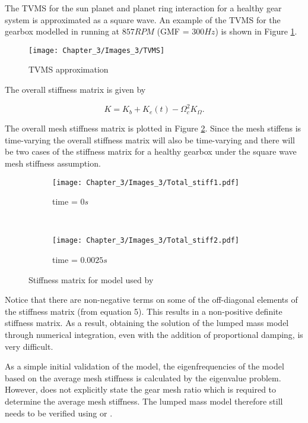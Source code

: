 The TVMS for the sun planet and planet ring interaction for a healthy gear system is approximated as a square wave. An example of the TVMS for the gearbox modelled in \cite{Chaari2006} running at $857RPM$ (GMF = $300Hz$) is shown in Figure \ref{F:TVMS}.


\begin{figure}[H]
	\centering
	\texttt{[image: Chapter\_3/Images\_3/TVMS]}
	\caption{TVMS approximation}
	\label{F:TVMS}
\end{figure}


The overall stiffness matrix is given by

\begin{equation}
K = K_{b}+K_{e}(t)-\Omega_{c}^{2} K_{\Omega}.
\end{equation}

The overall mesh stiffness matrix is plotted in Figure \ref{F:Stiffness}. Since the mesh stiffens is time-varying the overall stiffness matrix will also be time-varying and there will be two cases of the stiffness matrix for a healthy gearbox under the square wave mesh stiffness assumption. 

\begin{figure}[H]
	\centering
	\begin{subfigure}{0.49\textwidth}
		\texttt{[image: Chapter\_3/Images\_3/Total\_stiff1.pdf]}
		\caption{time = $0s$ }
	\end{subfigure}
	~
	\begin{subfigure}{0.49\textwidth}
		\texttt{[image: Chapter\_3/Images\_3/Total\_stiff2.pdf]}
		\caption{time = $0.0025s$ }
	\end{subfigure}
	
	\caption{Stiffness matrix for model used by \cite{Chaari2006}}
	\label{F:Stiffness}
\end{figure}

Notice that there are non-negative terms on some of the off-diagonal elements of the stiffness matrix (from \cite{Chaari2006} equation 5). This results in a non-positive definite stiffness matrix. As a result, obtaining the solution of the lumped mass model through numerical integration, even with the addition of proportional damping, is very difficult.  

As a simple initial validation of the model, the eigenfrequencies of the model based on the average mesh stiffness is calculated by the eigenvalue problem. However, \cite{Chaari2006} does not explicitly state the gear mesh ratio which is required to determine the average mesh stiffness. The lumped mass model therefore still needs to be verified using \cite{Chaari2006} or \cite{Lin1999}.



